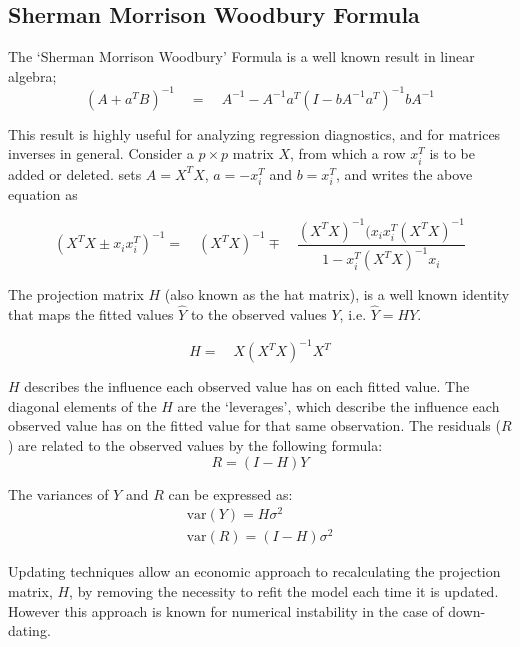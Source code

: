\documentclass[12pt, a4paper]{report}
\theoremstyle{plain}
\theoremstyle{definition}
\theoremstyle{remark}
\begin{document}
	
	\subsection{Sherman Morrison Woodbury Formula}
	
	The `Sherman Morrison Woodbury' Formula is a well known result in
	linear algebra;
	\begin{equation}
	(A+a^{T}B)^{-1} \quad = \quad A^{-1}-
	A^{-1}a^{T}(I-bA^{-1}a^{T})^{-1}bA^{-1}
	\end{equation}
	
	This result is highly useful for analyzing regression diagnostics,
	and for matrices inverses in general. Consider a $p \times p$
	matrix $X$, from which a row $x_{i}^{T}$ is to be added or
	deleted. \citet{CookWeisberg} sets $A = X^{T}X$, $a=-x_{i}^{T}$
	and $b=x_{i}^{T}$, and writes the above equation as
	
	\begin{equation}
	(X^{T}X \pm x_{i}x_{i}^{T})^{-1} = \quad(X^{T}X )^{-1} \mp \quad
	\frac{(X^{T}X)^{-1}(x_{i}x_{i}^{T}(X^{T}X)^{-1}}{1-x_{i}^{T}(X^{T}X)^{-1}x_{i}}
	\end{equation}
	
	
	The projection matrix $H$ (also known as the hat matrix), is a
	well known identity that maps the fitted values $\hat{Y}$ to the
	observed values $Y$, i.e. $\hat{Y} = HY$.
	
	\begin{equation}
	H =\quad X(X^{T}X)^{-1}X^{T}
	\end{equation}
	
	$H$ describes the influence each observed value has on each fitted
	value. The diagonal elements of the $H$ are the `leverages', which
	describe the influence each observed value has on the fitted value
	for that same observation. The residuals ($R$) are related to the
	observed values by the following formula:
	\begin{equation}
	R = (I-H)Y
	\end{equation}
	
	The variances of $Y$ and $R$ can be expressed as:
	\begin{eqnarray}
	\mbox{var}(Y) = H\sigma^{2} \nonumber\\
	\mbox{var}(R) = (I-H)\sigma^{2}
	\end{eqnarray}
	
	Updating techniques allow an economic approach to recalculating
	the projection matrix, $H$, by removing the necessity to refit the
	model each time it is updated. However this approach is known for
	numerical instability in the case of down-dating.
	
\end{document}
